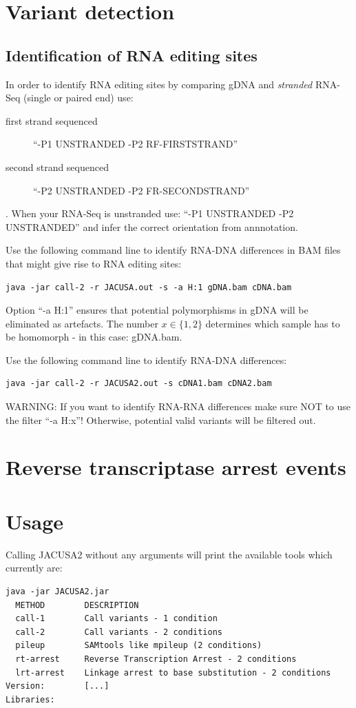 \documentclass[10pt,a4paper]{article}
\begin{document}
\section{Variant detection}
\subsection{Identification of RNA editing sites}
In order to identify RNA editing sites by comparing gDNA and \emph{stranded} RNA-Seq (single or paired end) use:
\begin{description} 
\item[first strand sequenced] ``-P1 UNSTRANDED -P2 RF-FIRSTSTRAND''
\item[second strand sequenced] ``-P2 UNSTRANDED -P2 FR-SECONDSTRAND''
\end{description}.
When your RNA-Seq is unstranded use: ``-P1 UNSTRANDED -P2 UNSTRANDED'' and infer the correct orientation from annnotation.

Use the following command line to identify RNA-DNA differences in BAM files that might give rise to RNA editing sites:
\begin{verbatim}
java -jar call-2 -r JACUSA.out -s -a H:1 gDNA.bam cDNA.bam
\end{verbatim}
Option ``-a H:1'' ensures that potential polymorphisms in gDNA will be eliminated as artefacts. The number $x \in \{1, 2\}$
determines which sample has to be homomorph - in this case: gDNA.bam.

Use the following command line to identify RNA-DNA differences:
\begin{verbatim}
java -jar call-2 -r JACUSA2.out -s cDNA1.bam cDNA2.bam
\end{verbatim}
WARNING: If you want to identify RNA-RNA differences make sure NOT to use the filter ``-a H:x''! Otherwise, potential valid variants will be filtered out. 
\section{Reverse transcriptase arrest events}
\section{Usage}
Calling JACUSA2 without any arguments will print the available tools which currently are:
\begin{verbatim}
java -jar JACUSA2.jar
  METHOD        DESCRIPTION
  call-1        Call variants - 1 condition
  call-2        Call variants - 2 conditions
  pileup        SAMtools like mpileup (2 conditions)
  rt-arrest     Reverse Transcription Arrest - 2 conditions
  lrt-arrest    Linkage arrest to base substitution - 2 conditions
Version: 		[...]
Libraries: 	
\end{verbatim}
\end{document}
